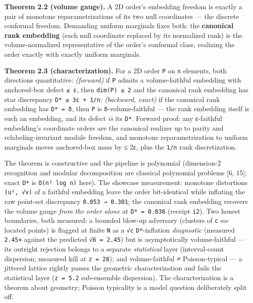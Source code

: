 \documentclass[11pt]{article}
\begin{document}
\textbf{Theorem 2.2 (volume gauge).} A 2D order's embedding freedom is exactly a pair of monotone reparametrizations of its two null coordinates — the discrete conformal freedom. Demanding uniform marginals fixes both: the \textbf{canonical rank embedding} (each null coordinate replaced by its normalized rank) is the volume-normalized representative of the order's conformal class, realizing the order exactly with exactly uniform marginals.

\textbf{Theorem 2.3 (characterization).} For a 2D order \texttt{P} on \texttt{n} elements, both directions quantitative: \emph{(forward)} if \texttt{P} admits a volume-faithful embedding with anchored-box defect \texttt{≤ ε}, then \texttt{dim(P) ≤ 2} and the canonical rank embedding has star discrepancy \texttt{D* ≤ 3ε + 1/n}; \emph{(backward, exact)} if the canonical rank embedding has \texttt{D* = δ}, then \texttt{P} is \texttt{δ}-volume-faithful — the rank embedding itself is such an embedding, and its defect \emph{is} its \texttt{D*}. Forward proof: any ε-faithful embedding's coordinate orders are the canonical realizer up to parity and relabeling-invariant module freedom, and monotone reparametrization to uniform marginals moves anchored-box mass by ≤ 2ε, plus the \texttt{1/n} rank discretization.

The theorem is constructive and the pipeline is polynomial (dimension-2 recognition and modular decomposition are classical polynomial problems [6, 15]; exact \texttt{D*} is \texttt{O(n² log n)} here). The showcase measurement: monotone distortions \texttt{(u², √v)} of a faithful embedding leave the order bit-identical while inflating the raw point-set discrepancy \texttt{0.053 → 0.301}; the canonical rank embedding recovers the volume gauge \emph{from the order alone} at \texttt{D* = 0.036} (receipt \texttt{i2}). Two honest boundaries, both measured: a bounded blow-up adversary (clusters of \texttt{c} co-located points) is flagged at finite \texttt{N} as a \texttt{√c} \texttt{D*}-inflation \emph{diagnostic} (measured \texttt{2.45×} against the predicted \texttt{√6 = 2.45}) but is asymptotically volume-faithful — its outright rejection belongs to a separate \emph{statistical} layer (interval-count dispersion; measured kill at \texttt{z = 28}); and volume-faithful ≠ Poisson-typical — a jittered lattice rightly passes the geometric characterization and fails the statistical layer (\texttt{z = 5.2} sub-ensemble dispersion). The characterization is a theorem about geometry; Poisson typicality is a model question deliberately split off.
\end{document}
